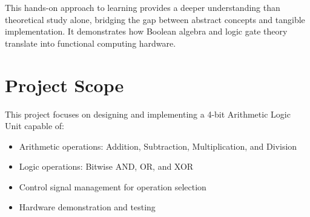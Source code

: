 This hands-on approach to learning provides a deeper understanding than theoretical study alone, bridging the gap between abstract concepts and tangible implementation. It demonstrates how Boolean algebra and logic gate theory translate into functional computing hardware.

\section{Project Scope}

This project focuses on designing and implementing a 4-bit Arithmetic Logic Unit capable of:
\begin{itemize}
    \item Arithmetic operations: Addition, Subtraction, Multiplication, and Division
    \item Logic operations: Bitwise AND, OR, and XOR
    \item Control signal management for operation selection
    \item Hardware demonstration and testing
\end{itemize}
